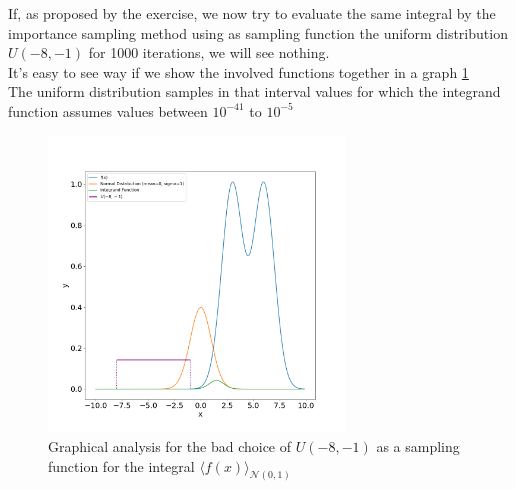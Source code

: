 If, as proposed by the exercise, we now try to evaluate the same integral by the importance sampling 
method using as sampling function the uniform distribution $U(-8, -1)$ for 1000 iterations, we will see nothing. \\
It's easy to see way if we show the involved functions together in a graph \ref{badchoice} \\
The uniform distribution samples in that interval values for which the integrand function assumes values between $10^{-41}$ to $10^{-5}$

\begin{figure}[t!]
  \centering
  \includegraphics[width=0.7\textwidth]{FIG/exercise_3_images/distribution_consideration.png}
  \caption{Graphical analysis for the bad choice of $U(-8,-1)$ as a sampling function for the integral $\langle f(x) \rangle_{\mathcal{N}(0,1)}$}
  \label{badchoice}
  \end{figure}